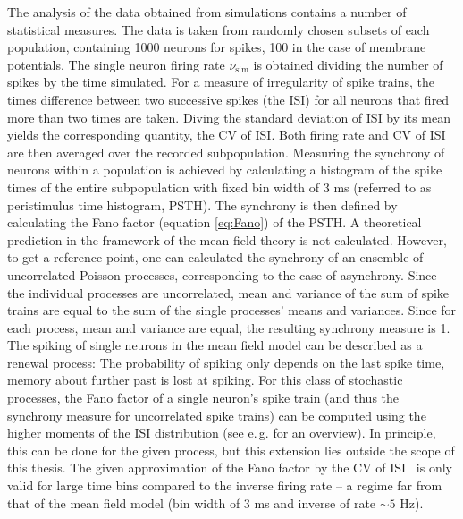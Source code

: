 The analysis of the data obtained from simulations contains a number of 
statistical measures. The data is taken from randomly chosen subsets of each population, 
containing 1000 neurons for spikes, 100 in the case of membrane potentials. 
The single neuron firing rate $\nu_\text{sim}$ is 
obtained dividing the number of spikes by the time simulated. 
For a measure of irregularity of spike trains, the times difference
between two successive spikes (the ISI) for all neurons that fired more than two times 
are taken. Diving the standard deviation of ISI by its mean
yields the corresponding quantity, the CV of ISI. Both firing rate and CV of ISI 
are then averaged over the recorded subpopulation. 
Measuring the synchrony of neurons within a population is achieved by 
calculating a histogram of the spike times of the entire subpopulation
with fixed bin width of $3$ ms (referred to as peristimulus time histogram, PSTH).
The synchrony is then defined by calculating the Fano factor (equation
\eqref{eq:Fano}) of the PSTH.
A theoretical prediction in the framework of the mean field theory is not calculated. 
However, to get a reference point, one can calculated the synchrony of an ensemble 
of uncorrelated Poisson processes, corresponding to the case of asynchrony. 
Since the individual processes are uncorrelated, mean and variance of the sum of 
spike trains are equal to the sum of the single processes' means and variances. 
Since for each process, mean and variance are equal, the resulting synchrony measure is 1. 
The spiking of single neurons in the mean field model can be described as a renewal 
process: The probability of spiking only depends on the last spike time, memory about 
further past is lost at spiking. For this class of stochastic processes, the Fano factor 
of a single neuron's spike train (and thus the synchrony measure for uncorrelated spike trains)
can be computed using the higher moments of the
ISI distribution (see e.\,g.  for an overview). In principle,
this can be done for the given process, but this extension lies outside the scope of this
thesis. The given approximation of the Fano factor by the CV of ISI~\cite{van2010stochastic}
is only valid for large time bins compared to the inverse firing rate -- a regime far from 
that of the mean field model (bin width of 3 ms and inverse of rate $\sim 5$ Hz).

